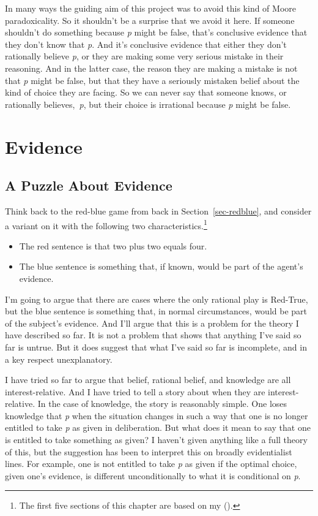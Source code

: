 \documentclass[
  12pt,
  letterpaper,
]{scrbook}
\providecommand{\tightlist}{%
  \setlength{\itemsep}{0pt}\setlength{\parskip}{0pt}}\usepackage{longtable,booktabs,array}
\begin{document}
In many ways the guiding aim of this project was to avoid this kind of
Moore paradoxicality. So it shouldn't be a surprise that we avoid it
here. If someone shouldn't do something because \emph{p} might be false,
that's conclusive evidence that they don't know that \emph{p}. And it's
conclusive evidence that either they don't rationally believe \emph{p},
or they are making some very serious mistake in their reasoning. And in
the latter case, the reason they are making a mistake is not that
\emph{p} might be false, but that they have a seriously mistaken belief
about the kind of choice they are facing. So we can never say that
someone knows, or rationally believes,~\emph{p}, but their choice is
irrational because \emph{p} might be false.


\chapter{Evidence}\label{sec-evidence}

\section{A Puzzle About Evidence}\label{sec-evpuzzle}

Think back to the red-blue game from back in Section~\ref{sec-redblue},
and consider a variant on it with the following two
characteristics.\footnote{The first five sections of this chapter are
  based on my ().}

\begin{itemize}
\tightlist
\item
  The red sentence is that two plus two equals four.
\item
  The blue sentence is something that, if known, would be part of the
  agent's evidence.
\end{itemize}

I'm going to argue that there are cases where the only rational play is
Red-True, but the blue sentence is something that, in normal
circumstances, would be part of the subject's evidence. And I'll argue
that this is a problem for the theory I have described so far. It is not
a problem that shows that anything I've said so far is untrue. But it
does suggest that what I've said so far is incomplete, and in a key
respect unexplanatory.

I have tried so far to argue that belief, rational belief, and knowledge
are all interest-relative. And I have tried to tell a story about when
they are interest-relative. In the case of knowledge, the story is
reasonably simple. One loses knowledge that \emph{p} when the situation
changes in such a way that one is no longer entitled to take \emph{p} as
given in deliberation. But what does it mean to say that one is entitled
to take something as given? I haven't given anything like a full theory
of this, but the suggestion has been to interpret this on broadly
evidentialist lines. For example, one is not entitled to take \emph{p}
as given if the optimal choice, given one's evidence, is different
unconditionally to what it is conditional on \emph{p}.
\end{document}
